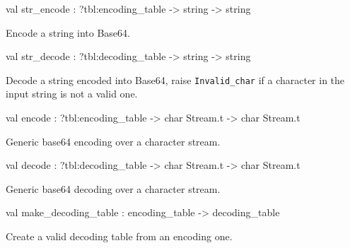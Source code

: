 \documentclass[11pt]{article}
\begin{document}
\label{val:XmlRpcBase64.str-underscoreencode}\begin{ocamldoccode}
val str_encode : ?tbl:encoding_table -> string -> string
\end{ocamldoccode}
\begin{ocamldocdescription}
Encode a string into Base64.


\end{ocamldocdescription}




\label{val:XmlRpcBase64.str-underscoredecode}\begin{ocamldoccode}
val str_decode : ?tbl:decoding_table -> string -> string
\end{ocamldoccode}
\begin{ocamldocdescription}
Decode a string encoded into Base64, raise {\tt{Invalid\_char}} if a
	character in the input string is not a valid one.


\end{ocamldocdescription}




\label{val:XmlRpcBase64.encode}\begin{ocamldoccode}
val encode : ?tbl:encoding_table -> char Stream.t -> char Stream.t
\end{ocamldoccode}
\begin{ocamldocdescription}
Generic base64 encoding over a character stream.


\end{ocamldocdescription}




\label{val:XmlRpcBase64.decode}\begin{ocamldoccode}
val decode : ?tbl:decoding_table -> char Stream.t -> char Stream.t
\end{ocamldoccode}
\begin{ocamldocdescription}
Generic base64 decoding over a character stream.


\end{ocamldocdescription}




\label{val:XmlRpcBase64.make-underscoredecoding-underscoretable}\begin{ocamldoccode}
val make_decoding_table : encoding_table -> decoding_table
\end{ocamldoccode}
\begin{ocamldocdescription}
Create a valid decoding table from an encoding one.


\end{ocamldocdescription}
\end{document}
